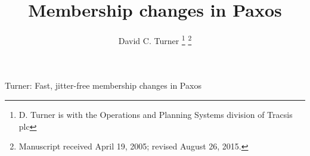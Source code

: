 \documentclass[journal]{IEEEtran}
\begin{document}
%
\title{Membership changes in Paxos}
%
%
%

\author{David C. Turner%
\thanks{D. Turner is with the Operations and Planning Systems division of Tracsis plc
}%
\thanks{Manuscript received April 19, 2005; revised August 26, 2015.}}

% 
%



%
{Turner: Fast, jitter-free membership changes in Paxos}
% 
\end{document}
